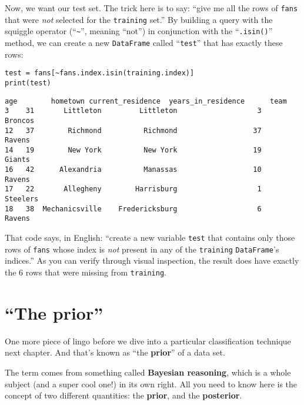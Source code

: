 Now, we want our test set. The trick here is to say: ``give me all the rows of
\texttt{fans} that were \textit{not} selected for the \texttt{training} set.''
By building a query with the squiggle operator (``\texttt{\textasciitilde}'',
meaning ``not'') in conjunction with the ``\texttt{.isin()}'' method, we can
create a new \texttt{DataFrame} called ``\texttt{test}'' that has exactly these
rows:

\begin{Verbatim}[fontsize=\footnotesize,samepage=true,frame=single,framesep=3mm]
test = fans[~fans.index.isin(training.index)]
print(test)
\end{Verbatim}
\vspace{-.2in}

\begin{Verbatim}[fontsize=\scriptsize,samepage=true,frame=leftline,framesep=5mm,framerule=1mm]
    age        hometown current_residence  years_in_residence      team
3    31       Littleton         Littleton                   3   Broncos
12   37        Richmond          Richmond                  37    Ravens
14   19        New York          New York                  19    Giants
16   42      Alexandria          Manassas                  10    Ravens
17   22       Allegheny        Harrisburg                   1  Steelers
18   38  Mechanicsville    Fredericksburg                   6    Ravens
\end{Verbatim}

That code says, in English: ``create a new variable \texttt{test} that contains
only those rows of \texttt{fans} whose index is \textit{not} present in any of
the \texttt{training} \texttt{DataFrame}'s indices.'' As you can verify through
visual inspection, the result does have exactly the 6 rows that were missing
from \texttt{training}.

\section{``The prior''}

\label{prior}

One more piece of lingo before we dive into a particular classification
technique next chapter. And that's known as ``the \textbf{prior}'' of a data
set.


The term comes from something called \textbf{Bayesian reasoning}, which is a
whole subject (and a super cool one!) in its own right. All you need to know
here is the concept of two different quantities: the \textbf{prior}, and the
\textbf{posterior}.

